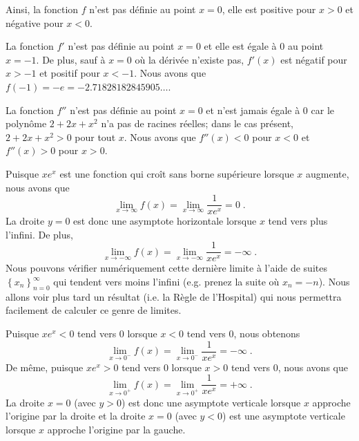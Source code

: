 {\begin{egg}
Ainsi, la fonction $f$ n'est pas définie au point $x=0$, elle est
positive pour $x>0$ et négative pour $x<0$.

La fonction $f'$ n'est pas définie au point $x=0$ et elle est égale à
$0$ au point $x=-1$.  De plus, sauf à $x=0$ où la dérivée n'existe
pas, $f'(x)$ est négatif pour $x>-1$ et positif pour $x<-1$.  Nous avons que
$f(-1) = -e = -2.71828182845905\ldots$.

La fonction $f''$ n'est pas définie au point $x=0$ et n'est jamais
égale à $0$ car le polynôme $2 + 2x + x^2$ n'a pas de racines réelles;
dans le cas présent, $2 + 2x + x^2>0$ pour tout $x$.  Nous avons que
$f''(x)<0$ pour $x<0$ et $f''(x)>0$ pour $x>0$.

Puisque $xe^x$ est une fonction qui croît sans borne supérieure
lorsque $x$ augmente, nous avons que
\[
\lim_{x\rightarrow \infty} f(x) =
\lim_{x\rightarrow \infty} \frac{1}{xe^x} = 0 \; .
\]
La droite $y=0$ est donc une asymptote horizontale lorsque $x$ tend
vers plus l'infini.  De plus,
\[
\lim_{x\rightarrow -\infty} f(x) =
\lim_{x\rightarrow -\infty} \frac{1}{xe^x} = -\infty \; .
\]
Nous pouvons vérifier numériquement cette dernière limite à l'aide de
suites $\displaystyle \left\{x_n\right\}_{n=0}^\infty$ qui tendent
vers moins l'infini (e.g. prenez la suite où $x_n = -n$).  Nous allons voir
plus tard un résultat (i.e. la Règle de l'Hospital) qui nous
permettra facilement de calculer ce genre de limites.

Puisque $xe^x<0$ tend vers $0$ lorsque $x<0$ tend vers $0$, nous
obtenons
\[
\lim_{x\rightarrow 0^-} f(x) =
\lim_{x\rightarrow 0^-} \frac{1}{xe^x} = -\infty  \; .
\]
De même, puisque $xe^x>0$ tend vers $0$ lorsque $x>0$ tend vers $0$,
nous avons que
\[
\lim_{x\rightarrow 0^+} f(x) =
\lim_{x\rightarrow 0^+} \frac{1}{xe^x} = +\infty  \; .
\]
La droite $x=0$ (avec $y>0$) est donc une asymptote verticale lorsque
$x$ approche l'origine par la droite et la droite $x=0$ (avec $y<0$)
est une asymptote verticale lorsque $x$ approche l'origine par la
gauche.


\end{egg}}
